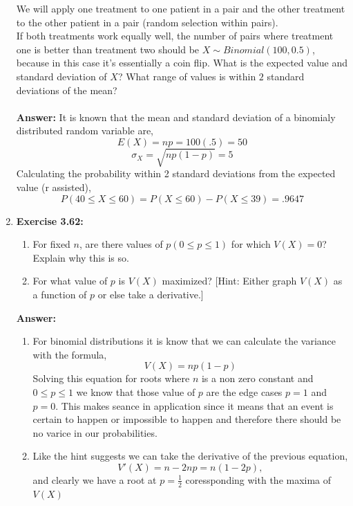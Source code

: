\documentclass[12pt]{article}
\theoremstyle{homework}
\begin{document}
\begin{enumerate}
We will apply one treatment to one patient in a pair and the other treatment to the other patient in a pair (random selection within pairs).\\

If both treatments work equally well, the number of pairs where treatment one is better than treatment two should be $X \sim Binomial(100,0.5)$, because in this case it’s essentially a coin flip. What is the expected value and standard deviation of $X$? What range of values is within $2$ standard deviations of the mean?\\
\\
\textbf{Answer:} 
It is known that the mean and standard deviation of a binomialy distributed  random variable are,
\begin{equation*}
  E(X) = np = 100(.5) = 50
\end{equation*}
\begin{equation*}
  \sigma_X = \sqrt{np(1-p)} = 5
\end{equation*}
Calculating the probability within 2 standard deviations from the expected value (r assisted),
\begin{equation*}
  P(40\le X \le 60) = P(X \le 60) - P(X \le 39) = .9647
\end{equation*}
\vspace{.5in}

\item\hspace{.5in}\textbf{Exercise 3.62:}
\begin{enumerate}
\item For fixed $n$, are there values of $p(0 \le p \le 1)$ for which $V(X) = 0$? Explain why this is so.
\item For what value of $p$ is $V(X)$ maximized? [Hint: Either graph $V(X)$ as a function of $p$ or else take a derivative.]
\end{enumerate}
\textbf{Answer:} 
\begin{enumerate}
\item For binomial distributions it is know that we can calculate the variance with the formula,
\begin{equation*}
  V(X) = np(1 - p)
\end{equation*}
Solving this equation for roots where $n$ is a non zero constant and $0 \le p \le 1$ we know that those value of $p$ are the edge cases $p = 1$ and $p = 0$. This makes seance in application since 
it means that an event is certain to happen or impossible to happen and therefore there should be no varice in our probabilities.\\


\item Like the hint suggests we can take the derivative of the previous equation,
\begin{equation*}
  V'(X) = n - 2np = n(1-2p),
\end{equation*}
and clearly we have a root at $p = \frac{1}{2}$ coressponding with the maxima of $V(X)$
\end{enumerate}
\vspace{.5in}

\end{enumerate}
\end{document}

